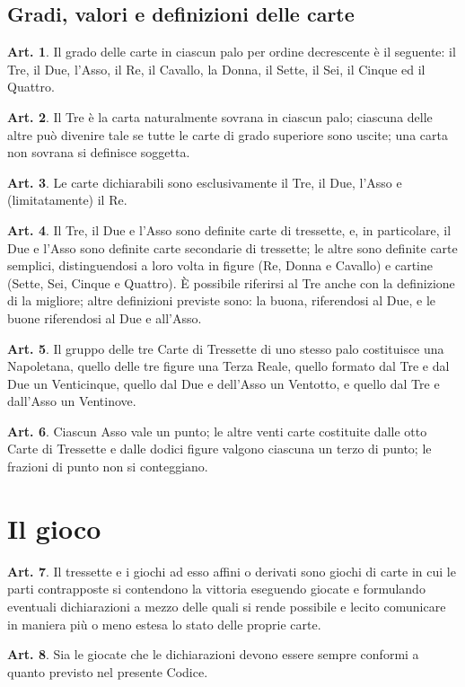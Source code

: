 \documentclass[italian,a4paper]{article}
\theoremstyle{definition}
\newtheorem{art}{Art.}
\begin{document}
\subsection{Gradi, valori e definizioni delle carte}
\begin{art}
    Il grado delle carte in ciascun palo per ordine decrescente è il seguente: il Tre, il Due, l'Asso, il Re, il Cavallo, la Donna, il Sette, il Sei, il Cinque ed il Quattro.
\end{art}
\begin{art}
    Il Tre è la carta naturalmente sovrana in ciascun palo; ciascuna delle altre può divenire tale se tutte le carte di grado superiore sono uscite; una carta non sovrana si definisce soggetta. 
\end{art}
\begin{art}
    Le carte dichiarabili sono esclusivamente il Tre, il Due, l'Asso e (limitatamente) il Re.
\end{art}
\begin{art}
    Il Tre, il Due e l'Asso sono definite carte di tressette, e, in particolare, il Due e l'Asso sono definite carte secondarie di tressette; le altre sono definite carte semplici, distinguendosi a loro volta in figure (Re, Donna e Cavallo) e cartine (Sette, Sei, Cinque e Quattro). \`E possibile riferirsi al Tre anche con la definizione di la migliore; altre definizioni previste sono: la buona, riferendosi al Due, e le buone riferendosi al Due e all'Asso.
\end{art}
\begin{art}
    Il gruppo delle tre Carte di Tressette di uno stesso palo costituisce una Napoletana, quello delle tre figure una Terza Reale, quello formato dal Tre e dal Due un Venticinque, quello dal Due e dell'Asso un Ventotto, e quello dal Tre e dall'Asso un Ventinove.
\end{art}
\begin{art}
    Ciascun Asso vale un punto; le altre venti carte costituite dalle otto Carte di Tressette e dalle dodici figure valgono ciascuna un terzo di punto; le frazioni di punto non si conteggiano.
\end{art}
\section{Il gioco}
\begin{art}
    Il tressette e i giochi ad esso affini o derivati sono giochi di carte in cui le parti contrapposte si contendono la vittoria eseguendo giocate e formulando eventuali dichiarazioni a mezzo delle quali si rende possibile e lecito comunicare in maniera più o meno estesa lo stato delle proprie carte.
\end{art}
\begin{art}
    Sia le giocate che le dichiarazioni devono essere sempre conformi a quanto previsto nel presente Codice.
\end{art}
\end{document}

